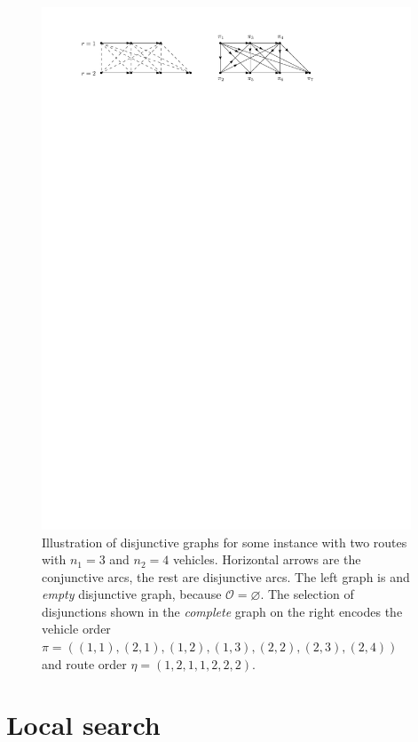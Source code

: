 \documentclass[a4paper]{report}
\theoremstyle{definition}
\theoremstyle{plain}
\begin{document}
\begin{figure}
  \centering
  \includegraphics[width=0.98\textwidth]{figures/single/disjunctive_graph.pdf}
  \caption{Illustration of disjunctive graphs for some instance with two routes
    with $n_{1} = 3$ and $n_{2} = 4$ vehicles. Horizontal arrows are the
    conjunctive arcs, the rest are disjunctive arcs. The left graph is and
    \textit{empty} disjunctive graph, because $\mathcal{O} = \varnothing$. The
    selection of disjunctions shown in the \textit{complete} graph on the right
    encodes the vehicle order
    $\pi = ((1,1), (2,1), (1,2), (1,3), (2,2), (2,3), (2,4))$ and route order
    $\eta = (1, 2, 1, 1, 2, 2, 2)$.}
  \label{fig:disjunctive_graphs}
\end{figure}

\section{Local search}
\label{sec:local_search}
\end{document}
